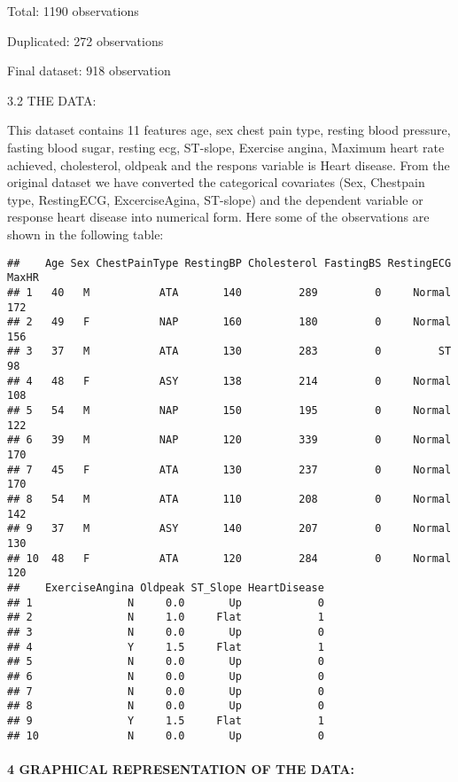 \documentclass[
]{article}
\begin{document}
Total: 1190 observations

Duplicated: 272 observations

Final dataset: 918 observation

3.2 THE DATA:

This dataset contains 11 features age, sex chest pain type, resting
blood pressure, fasting blood sugar, resting ecg, ST-slope, Exercise
angina, Maximum heart rate achieved, cholesterol, oldpeak and the
respons variable is Heart disease. From the original dataset we have
converted the categorical covariates (Sex, Chestpain type, RestingECG,
ExcerciseAgina, ST-slope) and the dependent variable or response heart
disease into numerical form. Here some of the observations are shown in
the following table:

\begin{verbatim}
##    Age Sex ChestPainType RestingBP Cholesterol FastingBS RestingECG MaxHR
## 1   40   M           ATA       140         289         0     Normal   172
## 2   49   F           NAP       160         180         0     Normal   156
## 3   37   M           ATA       130         283         0         ST    98
## 4   48   F           ASY       138         214         0     Normal   108
## 5   54   M           NAP       150         195         0     Normal   122
## 6   39   M           NAP       120         339         0     Normal   170
## 7   45   F           ATA       130         237         0     Normal   170
## 8   54   M           ATA       110         208         0     Normal   142
## 9   37   M           ASY       140         207         0     Normal   130
## 10  48   F           ATA       120         284         0     Normal   120
##    ExerciseAngina Oldpeak ST_Slope HeartDisease
## 1               N     0.0       Up            0
## 2               N     1.0     Flat            1
## 3               N     0.0       Up            0
## 4               Y     1.5     Flat            1
## 5               N     0.0       Up            0
## 6               N     0.0       Up            0
## 7               N     0.0       Up            0
## 8               N     0.0       Up            0
## 9               Y     1.5     Flat            1
## 10              N     0.0       Up            0
\end{verbatim}

\hypertarget{graphical-representation-of-the-data}{%
\paragraph{4 GRAPHICAL REPRESENTATION OF THE
DATA:}\label{graphical-representation-of-the-data}}
\end{document}
